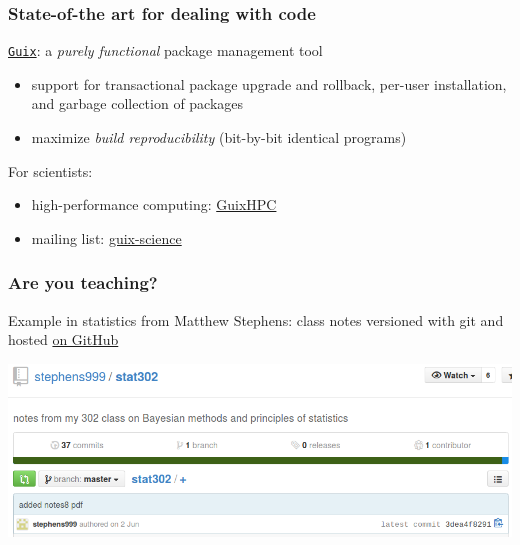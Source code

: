 \documentclass[c]{beamer} %
\begin{document}
\begin{frame}[fragile]
  \frametitle{State-of-the art for dealing with code}

  \href{https://guix.gnu.org/}{\texttt{Guix}}: a \textit{purely functional} package management tool

  \begin{itemize}
  \item support for transactional package upgrade and rollback, per-user installation, and garbage collection of packages
  \item maximize \textit{build reproducibility} (bit-by-bit identical programs)
  \end{itemize}

  \bigskip

  For scientists:
  \begin{itemize}
  \item high-performance computing: \href{https://hpc.guix.info/}{GuixHPC}
  \item mailing list: \href{https://lists.gnu.org/archive/html/guix-science/}{guix-science}
  \end{itemize}
\end{frame}

\begin{frame}
  \frametitle{Are you teaching?}
  Example in \alert{statistics} from Matthew Stephens: class notes versioned with git and hosted \href{https://github.com/stephens999/stat302}{on GitHub}
  
  \bigskip
  
  \begin{center}
    \includegraphics[width=\textwidth,height=\textheight,keepaspectratio=true]{mstephens_stat302}%
  \end{center}
\end{frame}  
\end{document}
